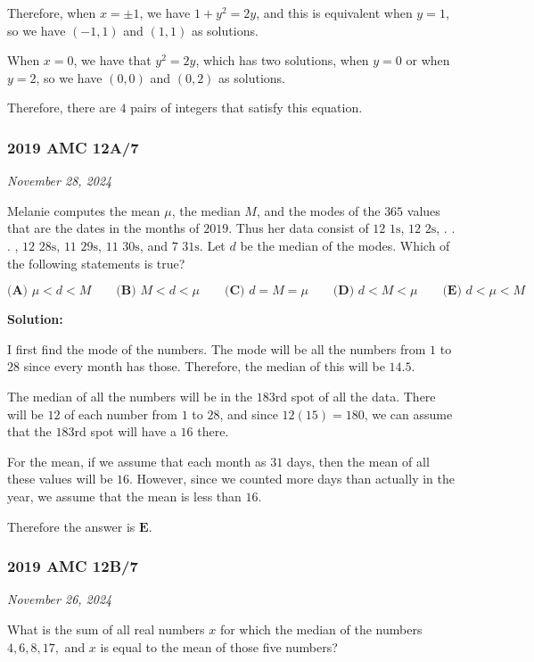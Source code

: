 \documentclass[../mathproblems.tex]{subfiles}
\begin{document}
Therefore, when $x=\pm 1$, we have $1+y^2=2y$, and this is equivalent when $y=1$, so we have $(-1,1)$ and $(1,1)$ as solutions.

When $x=0$, we have that $y^2=2y$, which has two solutions, when $y=0$ or when $y=2$, so we have $(0,0)$ and $(0,2)$ as solutions.

Therefore, there are $\boxed{4}$ pairs of integers that satisfy this equation.

\noindent\hrulefill

\subsubsection*{2019 AMC 12A/7} 
\textit{November 28, 2024}

Melanie computes the mean $\mu$, the median $M$, and the modes of the $365$ values that are the dates in the months of $2019$. Thus her data consist of $12$ $1\text{s}$, $12$ $2\text{s}$, . . . , $12$ $28\text{s}$, $11$ $29\text{s}$, $11$ $30\text{s}$, and $7$ $31\text{s}$. Let $d$ be the median of the modes. Which of the following statements is true?

$\textbf{(A) } \mu < d < M \qquad\textbf{(B) } M < d < \mu \qquad\textbf{(C) } d = M =\mu \qquad\textbf{(D) } d < M < \mu \qquad\textbf{(E) } d < \mu < M$

\textbf{Solution:}

I first find the mode of the numbers. The mode will be all the numbers from $1$ to $28$ since every month has those. Therefore, the median of this will be $14.5$.

The median of all the numbers will be in the $183$rd spot of all the data. There will be $12$ of each number from $1$ to $28$, and since $12(15) = 180$, we can assume that the $183$rd spot will have a $16$ there.

For the mean, if we assume that each month as $31$ days, then the mean of all these values will be $16$. However, since we counted more days than actually in the year, we assume that the mean is less than $16$.

Therefore the answer is $\boxed{\textbf{E}}$.

\noindent\hrulefill
\subsubsection*{2019 AMC 12B/7} 
\textit{November 26, 2024}

What is the sum of all real numbers $x$ for which the median of the numbers $4,6,8,17,$ and $x$ is equal to the mean of those five numbers?
\end{document}
